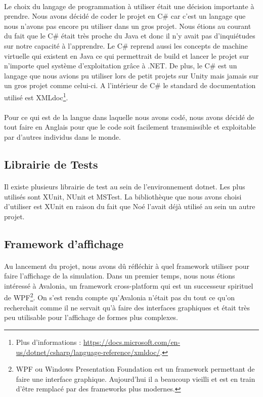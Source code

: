 \documentclass{EPUProjetDi}
\begin{document}
\paragraph{}
Le choix du langage de programmation à utiliser était une décision importante à prendre. Nous avons décidé de coder le projet en C\# car c'est un langage que nous
n'avons pas encore pu utiliser dans un gros projet. Nous étions au courant du fait que le C\# était très proche du Java et donc il n'y avait pas
d'inquiétudes sur notre capacité à l'apprendre. Le C\# reprend aussi les concepts de machine virtuelle qui existent en Java ce qui permettrait de build et lancer le projet
sur n'importe quel système d'exploitation grâce à .NET. 
De plus, le C\# est un langage que nous avions pu utiliser lors de petit projets sur Unity mais jamais sur un gros projet comme celui-ci. 
A l'intérieur de C\# le standard de documentation utilisé est XMLdoc\footnote{Plus d'informations : \url{https://docs.microsoft.com/en-us/dotnet/csharp/language-reference/xmldoc/}.}.

\paragraph{}
Pour ce qui est de la langue dans laquelle nous avons codé, nous avons décidé de tout faire en Anglais pour que le code soit facilement
transmissible et exploitable par d'autres individus dans le monde.

\subsection{Librairie de Tests}

\paragraph{}
Il existe plusieurs librairie de test au sein de l'environnement dotnet. Les plus utilisés sont XUnit, NUnit et MSTest.
La bibliothèque que nous avons choisi d'utiliser est XUnit en raison du fait que Noé l'avait déjà utilisé au sein un autre projet.

\subsection{Framework d'affichage}

\paragraph{}
Au lancement du projet, nous avons dû réfléchir à quel framework utiliser pour faire l'affichage de la simulation.
Dans un premier temps, nous nous étions intéressé à Avalonia, un framework cross-platform qui est un successeur spirituel de WPF\footnote{WPF ou Windows Presentation Foundation est un framework permettant
de faire une interface graphique. Aujourd'hui il a beaucoup vieilli et est en train d'être remplacé par des frameworks plus modernes.}.
On s'est rendu compte qu'Avalonia n'était pas du tout ce qu'on recherchait comme il ne servait qu'à faire des interfaces graphiques et était très peu utilisable pour l'affichage de formes plus complexes.
\end{document}
